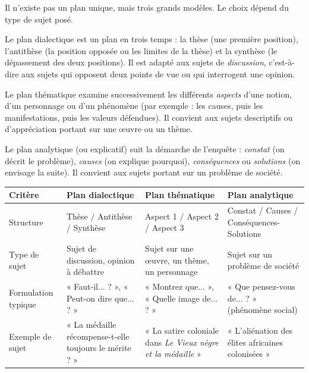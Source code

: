 \documentclass[11pt]{article}
\newcommand{\cle}[1]{{\popxbold\color{popdark}#1}}
\newcounter{popsec}
\newcounter{popsub}
\newcommand{\courssub}[1]{%
  \stepcounter{popsub}%
  \par\vspace{9pt}\noindent{\popxbold\fontsize{11.5}{13}\selectfont\color{popink}{\color{poporange}\thepopsec.\thepopsub}\hspace{6pt}#1}\par\nopagebreak\vspace{4pt}
}
\begin{document}
\courssub{Les trois types de plans}

Il n'existe pas un plan unique, mais trois grands modèles. Le choix dépend du type de sujet posé.

\begin{definition}
Le \cle{plan dialectique} est un plan en trois temps : la \cle{thèse} (une première position), l'\cle{antithèse} (la position opposée ou les limites de la thèse) et la \cle{synthèse} (le dépassement des deux positions). Il est adapté aux sujets de \emph{discussion}, c'est-à-dire aux sujets qui opposent deux points de vue ou qui interrogent une opinion.
\end{definition}

Le \cle{plan thématique} examine successivement les différents \emph{aspects} d'une notion, d'un personnage ou d'un phénomène (par exemple : les causes, puis les manifestations, puis les valeurs défendues). Il convient aux sujets descriptifs ou d'appréciation portant sur une œuvre ou un thème.

Le \cle{plan analytique} (ou explicatif) suit la démarche de l'enquête : \emph{constat} (on décrit le problème), \emph{causes} (on explique pourquoi), \emph{conséquences} ou \emph{solutions} (on envisage la suite). Il convient aux sujets portant sur un problème de société.

\begin{center}
\begin{tabularx}{\linewidth}{|l|X|X|X|}
\hline
\rowcolor{popblueL} \textbf{Critère} & \textbf{Plan dialectique} & \textbf{Plan thématique} & \textbf{Plan analytique} \\
\hline
Structure & Thèse / Antithèse / Synthèse & Aspect 1 / Aspect 2 / Aspect 3 & Constat / Causes / Conséquences-Solutions \\
\hline
Type de sujet & Sujet de discussion, opinion à débattre & Sujet sur une œuvre, un thème, un personnage & Sujet sur un problème de société \\
\hline
Formulation typique & « Faut-il... ? », « Peut-on dire que... ? » & « Montrez que... », « Quelle image de... ? » & « Que pensez-vous de... ? » (phénomène social) \\
\hline
Exemple de sujet & « La médaille récompense-t-elle toujours le mérite ? » & « La satire coloniale dans \emph{Le Vieux nègre et la médaille} » & « L'aliénation des élites africaines colonisées » \\
\hline
\end{tabularx}
\end{center}
\end{document}

